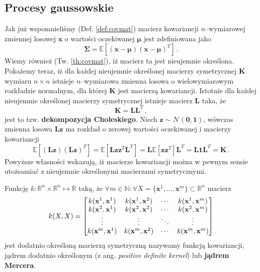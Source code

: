 \documentclass{myclass}
\numberwithin{equation}{subsection}
\begin{document}
\subsection{Procesy gaussowskie}

Jak już wspomnieliśmy (Def. \ref{def:covmat}) macierz kowariancji \(n\)--wymiarowej zmiennej losowej
\(\mathbf{x}\) o wartości oczekiwanej \(\boldsymbol{\mu}\) jest zdefiniowana jako
\begin{equation}
    \mathbf{\Sigma} = \mathbb{E}\left[(\mathbf{x} - \boldsymbol{\mu})(\mathbf{x} - \boldsymbol{\mu})^T\right]\,.
\end{equation}
Wiemy również (Tw. \ref{th:covmat}), iż macierz ta jest nieujemnie określona. Pokażemy teraz, iż dla
każdej nieujemnie określonej macierzy symetrycznej \(\mathbf{K}\) wymiaru \(n\times n\) istnieje
\(n\)--wymiarowa zmienna losowa o wielowymiarowym rozkładzie normalnym, dla której \(\mathbf{K}\)
jest macierzą kowariancji. Istotnie dla każdej nieujemnie określonej macierzy symetrycznej istnieje
macierz \(\mathbf{L}\) taka, że
\begin{equation}
    \mathbf{K} = \mathbf{L}\mathbf{L}^T\,,
\end{equation}
jest to tzw. \textbf{dekompozycja Choleskiego}. Niech \(\mathbf{z} \sim \mathcal{N}(\mathbf{0},
\mathbf{1})\), wówczas zmienna losowa \(\mathbf{L}\mathbf{z}\) ma rozkład o zerowej wartości
oczekiwanej i macierzy kowariancji
\begin{equation}
    \mathbb{E}\left[(\mathbf{L}\mathbf{z})(\mathbf{L}\mathbf{z})^T\right] = \mathbb{E}\left[\mathbf{L}\mathbf{z}\mathbf{z}^T\mathbf{L}^T\right] = \mathbf{L}\mathbb{E}[\mathbf{z}\mathbf{z}^T]\mathbf{L}^T = \mathbf{L}\mathbf{1}\mathbf{L}^T = \mathbf{K}\,.
\end{equation}
Powyższe własności wskazują, iż macierze kowariancji można w pewnym sensie utożsamiać z nieujemnie
określonymi macierzami symetrycznymi.

\begin{definition}
Funkcję \(k: \mathbb{R}^n\times\mathbb{R}^n\mapsto\mathbb{R}\) taką, że \(\forall m\in\mathbb{N} :
\forall X = \{\mathbf{x}^1,\ldots,\mathbf{x}^m\} \subset \mathbb{R}^n\) macierz
\begin{equation*}
    k(X,X) = \mqty[k(\mathbf{x}^1, \mathbf{x}^1) & k(\mathbf{x}^1, \mathbf{x}^2) & \cdots & k(\mathbf{x}^1, \mathbf{x}^m)\\
    k(\mathbf{x}^2, \mathbf{x}^1) & k(\mathbf{x}^2, \mathbf{x}^2) & \cdots & k(\mathbf{x}^2, \mathbf{x}^m)\\
    \vdots & \vdots & \ddots & \vdots\\
    k(\mathbf{x}^m, \mathbf{x}^1) & k(\mathbf{x}^m, \mathbf{x}^2) & \cdots & k(\mathbf{x}^m, \mathbf{x}^m)\\]
\end{equation*}
jest dodatnio określoną macierzą symetryczną nazywamy funkcją kowariancji, jądrem dodatnio
określonym (z ang. \textit{positive definite kernel}) lub \textbf{jądrem Mercera}.
\end{definition}
\end{document}
